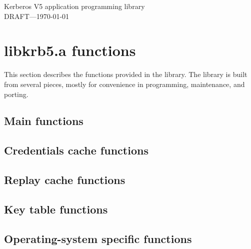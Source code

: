 \setlength{\oddsidemargin}{0.25in}
\setlength{\evensidemargin}{-0.25in}
\setlength{\topmargin}{-.5in}
\setlength{\textheight}{9in}
\setlength{\parskip}{.1in}
\setlength{\parindent}{2em}
\setlength{\textwidth}{6.25in}
\makeindex
\newif\ifdraft
\drafttrue
{}
\ifdraft
\pagestyle{fancy}
\lhead[\fancyplain{}\thepage]{\fancyplain{}{\sl \leftmark}}
\rhead[\fancyplain{}{\sl \leftmark}]{\fancyplain{}\thepage}
\else\pagestyle{headings}\fi

\thispagestyle{empty}
\begin{center}
{\Huge Kerberos V5 application programming library}
\ifdraft \\ {\Large DRAFT---\today}\fi
\end{center}
\section{libkrb5.a functions}
This section describes the functions provided in the 
library.  The library is built from several pieces, mostly for convenience in
programming, maintenance, and porting.

\ifdraft\sloppy\fi

\subsection{Main functions}


\subsection{Credentials cache functions}


\subsection{Replay cache functions}


\subsection{Key table functions}


\subsection{Operating-system specific functions}


